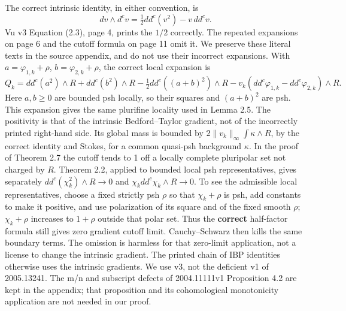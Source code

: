 \documentclass[
  10pt,
]{article}
\begin{document}
The correct intrinsic identity, in either convention, is \[
dv\wedge d^cv=\tfrac12 dd^c(v^2)-v\,dd^cv.
\] Vu v3 Equation (2.3), page 4, prints the \(1/2\) correctly. The
repeated expansions on page 6 and the cutoff formula on page 11 omit it.
We preserve these literal texts in the source appendix, and do not use
their incorrect expansions. With \(a=\varphi_{1,k}+\rho\),
\(b=\varphi_{2,k}+\rho\), the correct local expansion is \[
Q_k=dd^c(a^2)\wedge R+dd^c(b^2)\wedge R-
\tfrac12 dd^c((a+b)^2)\wedge R
-v_k(dd^c\varphi_{1,k}-dd^c\varphi_{2,k})\wedge R.
\] Here \(a,b\geq0\) are bounded psh locally, so their squares and
\((a+b)^2\) are psh. This expansion gives the same plurifine locality
used in Lemma 2.5. The positivity is that of the intrinsic
Bedford--Taylor gradient, not of the incorrectly printed right-hand
side. Its global mass is bounded by
\(2\|v_k\|_\infty\int\kappa\wedge R\), by the correct identity and
Stokes, for a common quasi-psh background \(\kappa\). In the proof of
Theorem 2.7 the cutoff tends to 1 off a locally complete pluripolar set
not charged by \(R\). Theorem 2.2, applied to bounded local psh
representatives, gives separately \(dd^c(\chi_k^2)\wedge R\to0\) and
\(\chi_k dd^c\chi_k\wedge R\to0\). To see the admissible local
representatives, choose a fixed strictly psh \(\rho\) so that
\(\chi_k+\rho\) is psh, add constants to make it positive, and use
polarization of its square and of the fixed smooth \(\rho\);
\(\chi_k+\rho\) increases to \(1+\rho\) outside that polar set. Thus the
\textbf{correct} half-factor formula still gives zero gradient cutoff
limit. Cauchy--Schwarz then kills the same boundary terms. The omission
is harmless for that zero-limit application, not a license to change the
intrinsic gradient. The printed chain of IBP identities otherwise uses
the intrinsic gradients. We use v3, not the deficient v1 of 2005.13241.
The m/n and subscript defects of 2004.11111v1 Proposition 4.2 are kept
in the appendix; that proposition and its cohomological monotonicity
application are not needed in our proof.
\end{document}
